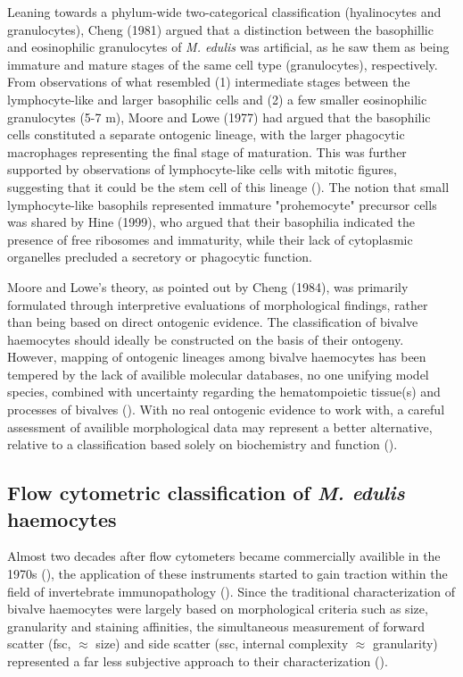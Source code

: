 Leaning towards a phylum-wide two-categorical classification (hyalinocytes and granulocytes), Cheng (1981) argued that a distinction between the basophillic and eosinophilic granulocytes of \emph{M. edulis} was artificial, as he saw them as being immature and mature stages of the same cell type (granulocytes), respectively. From observations of what resembled (1) intermediate stages between the lymphocyte-like and larger basophilic cells and (2) a few smaller eosinophilic granulocytes (5-7 \micro m), Moore and Lowe (1977) had argued that the basophilic cells constituted a separate ontogenic lineage, with the larger phagocytic macrophages representing the final stage of maturation. This was further supported by observations of lymphocyte-like cells with mitotic figures, suggesting that it could be the stem cell of this lineage (\cite{Moore1977}). The notion that small lymphocyte-like basophils represented immature "prohemocyte" precursor cells was shared by Hine (1999), who argued that their basophilia indicated the presence of free ribosomes and immaturity, while their lack of cytoplasmic organelles precluded a secretory or phagocytic function.

Moore and Lowe's theory, as pointed out by Cheng (1984), was primarily formulated through interpretive evaluations of morphological findings, rather than being based on direct ontogenic evidence. The classification of bivalve haemocytes should ideally be constructed on the basis of their ontogeny. However, mapping of ontogenic lineages among bivalve haemocytes has been tempered by the lack of availible molecular databases, no one unifying model species, combined with uncertainty regarding the hematompoietic tissue(s) and processes of bivalves (\cite{Hine1999, Smith2016, Pila2016, delaBallina2022}). With no real ontogenic evidence to work with, a careful assessment of availible morphological data may represent a better alternative, relative to a classification based solely on biochemistry and function (\cite{Hine1999}). 

\subsection{Flow cytometric classification of \emph{M. edulis} haemocytes}
Almost two decades after flow cytometers became commercially availible in the 1970s (\cite{Shapiro2004}), the application of these instruments started to gain traction within the field of invertebrate immunopathology (\cite{Fisher1988}). Since the traditional characterization of bivalve haemocytes were largely based on morphological criteria such as size, granularity and staining affinities, the simultaneous measurement of forward scatter (\acrshort{fsc}, $\approx$ size) and side scatter (\acrshort{ssc}, internal complexity $\approx$ granularity) represented a far less subjective approach to their characterization (\cite{AshtonAlcox1998, Allam2002, Mateo2009}).

